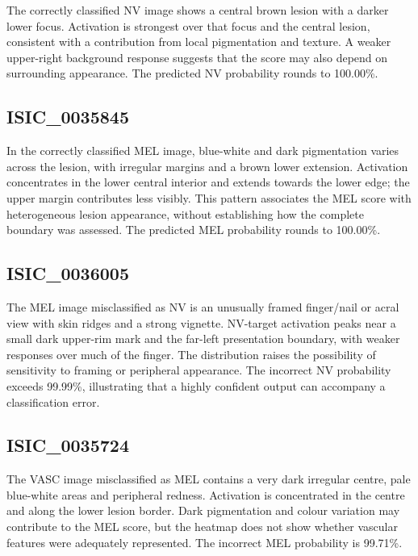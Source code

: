 \documentclass[11pt,a4paper]{article}
\begin{document}
The correctly classified NV image shows a central brown lesion with a darker lower focus. Activation is strongest over that focus and the central lesion, consistent with a contribution from local pigmentation and texture. A weaker upper-right background response suggests that the score may also depend on surrounding appearance. The predicted NV probability rounds to 100.00\%.



\subsection*{ISIC\_0035845}

In the correctly classified MEL image, blue-white and dark pigmentation varies across the lesion, with irregular margins and a brown lower extension. Activation concentrates in the lower central interior and extends towards the lower edge; the upper margin contributes less visibly. This pattern associates the MEL score with heterogeneous lesion appearance, without establishing how the complete boundary was assessed. The predicted MEL probability rounds to 100.00\%.



\subsection*{ISIC\_0036005}

The MEL image misclassified as NV is an unusually framed finger/nail or acral view with skin ridges and a strong vignette. NV-target activation peaks near a small dark upper-rim mark and the far-left presentation boundary, with weaker responses over much of the finger. The distribution raises the possibility of sensitivity to framing or peripheral appearance. The incorrect NV probability exceeds 99.99\%, illustrating that a highly confident output can accompany a classification error.



\subsection*{ISIC\_0035724}

The VASC image misclassified as MEL contains a very dark irregular centre, pale blue-white areas and peripheral redness. Activation is concentrated in the centre and along the lower lesion border. Dark pigmentation and colour variation may contribute to the MEL score, but the heatmap does not show whether vascular features were adequately represented. The incorrect MEL probability is 99.71\%.
\end{document}
